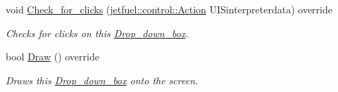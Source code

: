\begin{DoxyCompactItemize}
void \hyperlink{classjetfuel_1_1gui_1_1Drop__down__box_ae3607405b7e3fe981da75f0529e0a7a1}{Check\+\_\+for\+\_\+clicks} (\hyperlink{structjetfuel_1_1control_1_1Action}{jetfuel\+::control\+::\+Action} U\+I\+Sinterpreterdata) override
\begin{DoxyCompactList}\small\item\em Checks for clicks on this \hyperlink{classjetfuel_1_1gui_1_1Drop__down__box}{Drop\+\_\+down\+\_\+box}. \end{DoxyCompactList}\item 
bool \hyperlink{classjetfuel_1_1gui_1_1Drop__down__box_a1b62cab3674f45700ad9afd6076a8cb1}{Draw} () override
\begin{DoxyCompactList}\small\item\em Draws this \hyperlink{classjetfuel_1_1gui_1_1Drop__down__box}{Drop\+\_\+down\+\_\+box} onto the screen. \end{DoxyCompactList}\end{DoxyCompactItemize}
